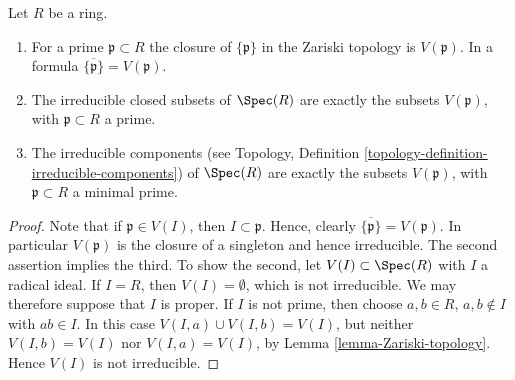 \begin{lemma}
\label{lemma-irreducible}
Let $R$ be a ring.
\begin{enumerate}
\item For a prime $\mathfrak p \subset R$ the closure
of $\{\mathfrak p\}$ in the Zariski topology is $V(\mathfrak p)$.
In a formula $\overline{\{\mathfrak p\}} = V(\mathfrak p)$.
\item The irreducible closed subsets of $\Spec(R)$ are
exactly the subsets $V(\mathfrak p)$, with $\mathfrak p \subset R$
a prime.
\item The irreducible components (see Topology,
Definition \ref{topology-definition-irreducible-components})
of $\Spec(R)$ are  exactly the subsets $V(\mathfrak p)$,
with $\mathfrak p \subset R$ a minimal prime.
\end{enumerate}
\end{lemma}

\begin{proof}
Note that if $ \mathfrak p \in V(I)$, then
$I \subset \mathfrak p$. Hence,
clearly $\overline{\{\mathfrak p\}} = V(\mathfrak p)$.
In particular $V(\mathfrak p)$ is the closure of
a singleton and hence irreducible.
The second assertion implies the third.
To show the second, let
$V(I) \subset \Spec(R)$ with $I$ a radical ideal.
If $I=R$, then $V(I)=\emptyset$, which is not irreducible.
We may therefore suppose that $I$ is proper.
If $I$ is not prime, then choose $a, b\in R$, $a, b\not \in I$
with $ab\in I$. In this case $V(I, a) \cup V(I, b) = V(I)$,
but neither $V(I, b) = V(I)$ nor $V(I, a) = V(I)$, by
Lemma \ref{lemma-Zariski-topology}. Hence $V(I)$ is not
irreducible.
\end{proof}